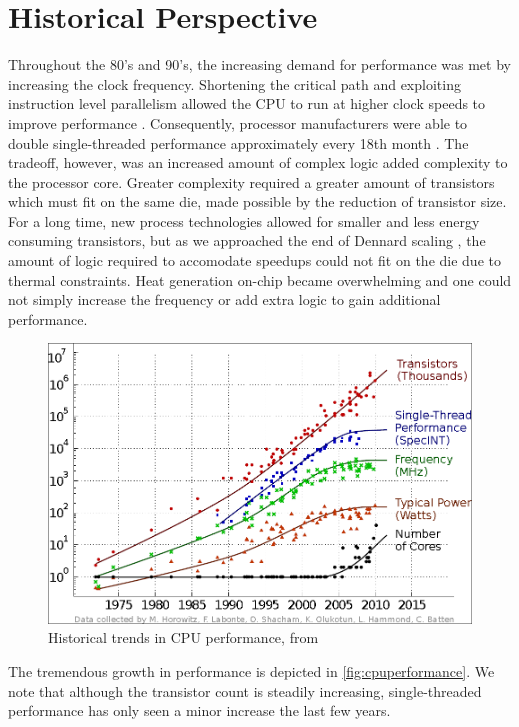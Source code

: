 \section{Historical Perspective}


Throughout the 80's and 90's, the increasing demand for performance was met by
increasing the clock frequency. Shortening the critical path and exploiting
instruction level parallelism allowed the CPU to run at higher clock speeds to
improve performance \cite{tanenbaum1984structured}. Consequently, processor
manufacturers were able to double single-threaded performance approximately
every 18th month \cite{moore1965cramming}. The tradeoff, however, was an
increased amount of complex logic added complexity to the processor core.
Greater complexity required a greater amount of transistors which must fit on
the same die, made possible by the reduction of transistor size. For a long
time, new process technologies allowed for smaller and less energy consuming
transistors, but as we approached the end of Dennard scaling
\cite{dennard1974design,esmaeilzadeh2011dark}, the amount of logic required to
accomodate speedups could not fit on the die due to thermal constraints. Heat
generation on-chip became overwhelming and one could not simply increase the
frequency or add extra logic to gain additional performance.

\begin{figure}
    \includegraphics[width=\textwidth]{figs/cpu-performance.png}
    \caption{Historical trends in CPU performance, from \cite{salishan2011}}
    \label{fig:cpuperformance}
\end{figure}

The tremendous growth in performance is depicted in
\autoref{fig:cpuperformance}. We note that although the transistor count is
steadily increasing, single-threaded performance has only seen a minor increase
the last few years.




